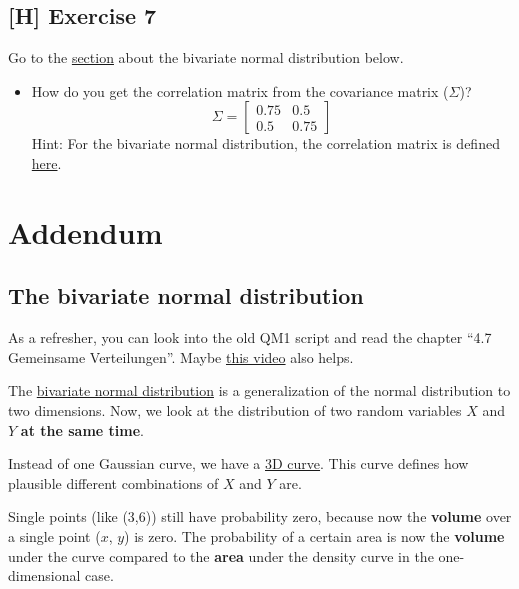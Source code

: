 \documentclass[
]{book}
\providecommand{\tightlist}{%
  \setlength{\itemsep}{0pt}\setlength{\parskip}{0pt}}
\begin{document}
\subsection{{[}H{]} Exercise 7}\label{exercise7_Intro}

Go to the \hyperref[bivariate_normal]{section} about the bivariate normal distribution below.

\begin{itemize}
\tightlist
\item
  How do you get the correlation matrix from the covariance matrix (\(\Sigma\))?
  \[
  \Sigma =
  \begin{bmatrix}
  0.75 & 0.5 \\
  0.5 & 0.75
  \end{bmatrix}
  \]
  Hint: For the bivariate normal distribution, the correlation matrix is defined
  \href{https://en.wikipedia.org/wiki/Multivariate_normal_distribution\#Bivariate_case}{here}.
\end{itemize}

\section{Addendum}\label{addendum}

\subsection{The bivariate normal distribution}\label{bivariate_normal}

As a refresher, you can look into the old QM1 script and read the
chapter ``4.7 Gemeinsame Verteilungen''.
Maybe \href{https://www.youtube.com/watch?v=SP2GKq8xJ5I&ab_channel=StatisticsNinja}{this video}
also helps.

The \href{https://en.wikipedia.org/wiki/Multivariate_normal_distribution}{bivariate normal distribution}
is a generalization of the normal distribution to two dimensions.
Now, we look at the distribution of two random variables \(X\) and \(Y\) \textbf{at the same time}.

Instead of one Gaussian curve, we have a
\href{https://en.wikipedia.org/wiki/Multivariate_normal_distribution\#/media/File:Multivariate_Gaussian.png}{3D curve}.
This curve defines how plausible different combinations of \(X\) and \(Y\) are.

Single points (like (3,6)) still have probability zero, because now the \textbf{volume} over a single point
(\(x\), \(y\)) is zero. The probability of a certain area is now the \textbf{volume} under the
curve compared to the \textbf{area} under the density curve in the one-dimensional case.
\end{document}
